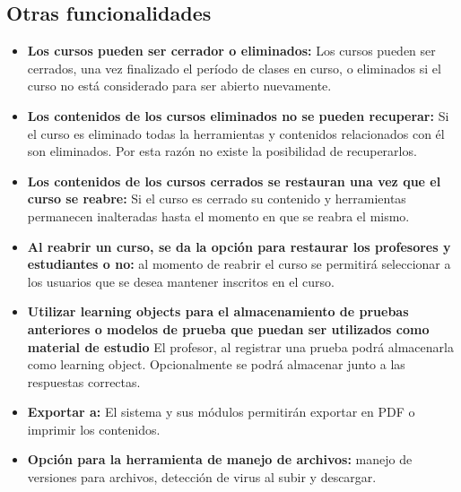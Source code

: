 \subsection{Otras funcionalidades} 

\begin{itemize}
 
\item \textbf{Los cursos pueden ser cerrador o eliminados:} Los cursos pueden ser cerrados, una vez finalizado el período de clases en curso, o eliminados si el curso no está considerado para ser abierto nuevamente.

\item \textbf{Los contenidos de los cursos eliminados no se pueden recuperar:} Si el curso es eliminado todas la herramientas y contenidos relacionados con él son eliminados. Por esta razón no existe la posibilidad de recuperarlos.

\item \textbf{Los contenidos de los cursos cerrados se restauran una vez que el curso se reabre:} Si el curso es cerrado su contenido y herramientas permanecen  inalteradas hasta el momento en que se reabra el mismo.

\item \textbf{Al reabrir un curso, se da la opción para restaurar los profesores y estudiantes o no:} al momento de reabrir el curso se permitirá seleccionar a los usuarios que se desea mantener inscritos en el curso. 

\item \textbf{Utilizar learning objects para el almacenamiento de pruebas anteriores o modelos de prueba que puedan ser utilizados como material de estudio} El profesor, al registrar una prueba podrá almacenarla como learning object. Opcionalmente se podrá almacenar junto a las respuestas correctas.  
    
\item \textbf{Exportar a:} El sistema y sus módulos permitirán exportar en PDF o imprimir los contenidos.

\item \textbf{Opción para la herramienta de manejo de archivos:} manejo de versiones para archivos, detección de virus al subir y descargar.

\end{itemize}